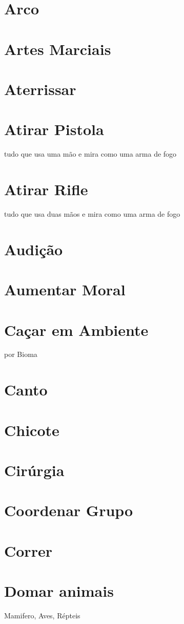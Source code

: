 \section{Arco}
\section{Artes Marciais}%
\section{Aterrissar}
\section{Atirar Pistola} tudo que usa uma mão e mira como uma arma de fogo%
\section{Atirar Rifle} tudo que usa duas mãos e mira como uma arma de fogo%
\section{Audição}
\section{Aumentar Moral}
\section{Caçar em Ambiente} por Bioma
\section{Canto}
\section{Chicote}
\section{Cirúrgia}
\section{Coordenar Grupo}
\section{Correr}
\section{Domar animais} Mamifero, Aves, Répteis
